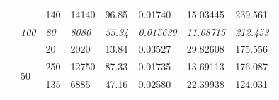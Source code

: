\documentclass[a4paper, 11pt]{report}
\begin{document}
\begin{table}[ht]
\begin{tabular}{|l|l|l|l|l|l|l|l|}
        \cline{2-8}
                                                                                & \multirow{3}{*}{\textit{100 }}                                                  & 140                                                                    & 14140                                                                      & 96.85                                                                                            & 0.01740          & 15.03445          & 239.561                                                                       \\ 
        \cline{3-8}
                                                                                &                                                                                 & \textit{80}                                                            & \textit{8080}                                                              & \textit{55.34}                                                                                   & \textit{0.015639} & \textit{11.08715} & \textit{212.453}                                                              \\ 
        \cline{3-8}
                                                                                &                                                                                 & 20                                                                     & 2020                                                                       & 13.84                                                                                            & 0.03527          & 29.82608          & 175.556                                                                       \\ 
        \cline{2-8}
                                                                                & \multirow{3}{*}{50}                                                             & 250                                                                    & 12750                                                                      & 87.33                                                                                            & 0.01735          & 13.69113          & 176.087                                                                       \\ 
        \cline{3-8}
                                                                                &                                                                                 & 135                                                                    & 6885                                                                       & 47.16                                                                                            & 0.02580          & 22.39938          & 124.031                                                                       \\ 

\end{tabular}
\end{table}
\end{document}
